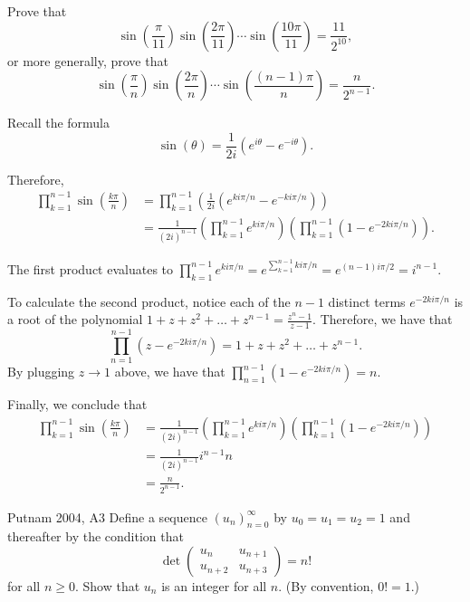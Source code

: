 
\begin{prob}{}{}
	Prove that \[ \sin\left(\frac{\pi}{11}\right) \sin\left(\frac{2\pi}{11}\right) \cdots \sin\left(\frac{10\pi}{11}\right) = \frac{11}{2^{10}},\]
	or more generally, prove that \[ \sin\left(\frac{\pi}{n}\right) \sin\left(\frac{2\pi}{n}\right) \cdots \sin\left(\frac{(n-1)\pi}{n}\right) = \frac{n}{2^{n-1}}.\]
\end{prob}

\begin{sol}{}{}
	Recall the formula \[
		\sin(\theta) = \frac{1}{2i}(e^{i\theta} - e^{-i\theta}).
	\]

	Therefore,
	\begin{align*}
		\prod_{k=1}^{n-1} \sin\left(\frac{k\pi}{n}\right)
		&= \prod_{k=1}^{n-1} \left( \frac{1}{2i} \left( e^{ki\pi/n} - e^{-ki\pi/n} \right) \right) \\
		&= \frac{1}{(2i)^{n-1}} \left( \prod_{k=1}^{n-1} e^{ki\pi/n} \right) \left( \prod_{k=1}^{n-1} (1 - e^{-2ki\pi/n}) \right).
	\end{align*}

	The first product evaluates to \(\prod_{k=1}^{n-1} e^{ki\pi/n} = e^{\sum_{k=1}^{n-1}ki\pi/n} = e^{(n-1)i\pi/2} = i^{n-1}\).

	To calculate the second product, notice each of the \(n-1\) distinct terms \(e^{-2ki\pi/n}\) is a root of the polynomial \(1 + z + z^2 + \dots + z^{n-1} = \frac{z^n - 1}{z - 1}\). Therefore, we have that \[
		\prod_{n=1}^{n-1} (z - e^{-2ki\pi/n}) = 1 + z + z^2 + \dots + z^{n-1}.
	\] By plugging \(z \to 1\) above, we have that \(\prod_{n=1}^{n-1} (1 - e^{-2ki\pi/n}) = n\).

	Finally, we conclude that
	\begin{align*}
		\prod_{k=1}^{n-1} \sin\left(\frac{k\pi}{n}\right)
		&= \frac{1}{(2i)^{n-1}} \left( \prod_{k=1}^{n-1} e^{ki\pi/n} \right) \left( \prod_{k=1}^{n-1} (1 - e^{-2ki\pi/n}) \right) \\
		&= \frac{1}{(2i)^{n-1}} i^{n-1} n \\
		&= \frac{n}{2^{n-1}}.
	\end{align*}

\end{sol}

\begin{prob}{Putnam 2004, A3}{}
	Define a sequence \((u_n)_{n=0}^\infty\) by  \(u_0 = u_1 = u_2 = 1\) and thereafter by the condition that  \[
		\det
		\begin{pmatrix}
			u_n & u_{n+1} \\
			u_{n+2} & u_{n+3}
		\end{pmatrix} = n!
	\] for all \(n \geq 0\). Show that \(u_n\) is an integer for all \(n\). 
	(By convention, \(0! = 1\).)
\end{prob}


